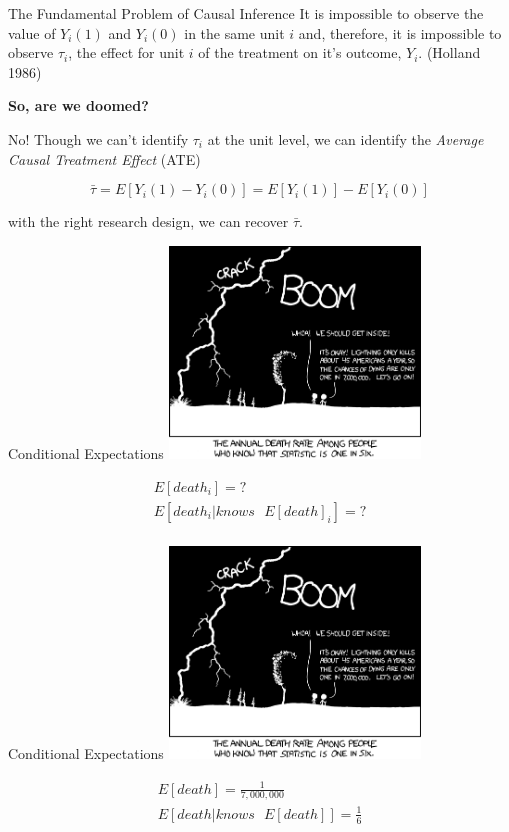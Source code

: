 \documentclass[
  ignorenonframetext,
]{beamer}
\begin{document}
\begin{frame}{The Fundamental Problem of Causal Inference}
\protect\hypertarget{the-fundamental-problem-of-causal-inference-1}{}
It is impossible to observe the value of \(Y_i(1)\) and \(Y_i(0)\) in
the same unit \(i\) and, therefore, it is impossible to observe
\(\tau_i\), the effect for unit \(i\) of the treatment on it's outcome,
\(Y_i\). (Holland 1986)

\centering

\textbf{So, are we doomed?}

\raggedright

No! Though we can't identify \(\tau_i\) at the unit level, we can
identify the \emph{Average Causal Treatment Effect} (ATE)

\[
\bar{\tau}=E[Y_i(1)-Y_i(0)]=E[Y_i(1)]-E[Y_i(0)]
\]

with the right research design, we can recover \(\bar{\tau}\).
\end{frame}

\begin{frame}{Conditional Expectations}
\protect\hypertarget{conditional-expectations}{}
\center \includegraphics[width=0.5\textwidth,height=\textheight]{"images/ciacomic.png"}

\[
\begin{aligned}
E[death_i]=?\\
E[death_i|knows\text{ }E[death]_i]=?\\
\end{aligned}
\]
\end{frame}

\begin{frame}{Conditional Expectations}
\protect\hypertarget{conditional-expectations-1}{}
\center \includegraphics[width=0.5\textwidth,height=\textheight]{"images/ciacomic.png"}

\[
\begin{aligned}
E[death]=\frac{1}{7,000,000}\\
E[death|knows\text{ }E[death]]=\frac{1}{6}\\
\end{aligned}
\]
\end{frame}
\end{document}
